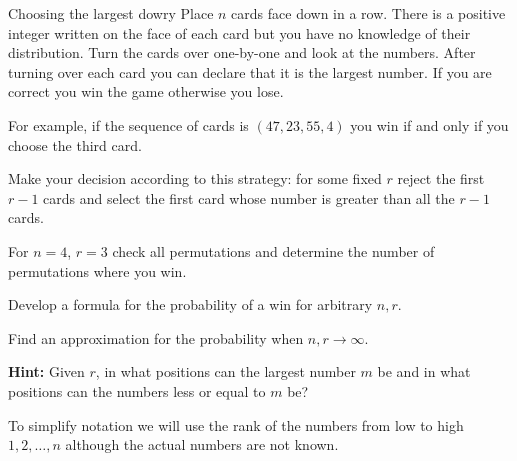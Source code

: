 \begin{prob}{Choosing the largest dowry}
Place $n$ cards face down in a row. There is a positive integer written on the face of each card but you have no knowledge of their distribution. Turn the cards over one-by-one and look at the numbers. After turning over each card you can declare that it is the largest number. If you are correct you win the game otherwise you lose.

For example, if the sequence of cards is $(47, 23, 55, 4)$ you win if and only if you choose the third card.

Make your decision according to this strategy: for some fixed $r$ reject the first $r-1$ cards and select the first card whose number is greater than all the $r-1$ cards.

 For $n=4$, $r=3$ check all permutations and determine the number of permutations where you win.

 Develop a formula for the probability of a win for arbitrary $n, r$.

 Find an approximation for the probability when $n,r\rightarrow \infty$.

\textbf{Hint:} Given $r$, in what positions can the largest number $m$ be and in what positions can the numbers less or equal to $m$ be? 

\end{prob}

\solution{}

To simplify notation we will use the rank of the numbers from low to high $1,2,\ldots,n$ although the actual numbers are not known.

